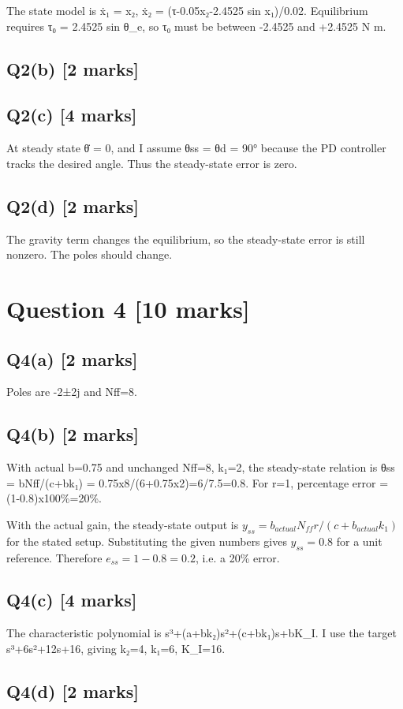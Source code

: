 \documentclass[11pt,a4paper]{article}
\begin{document}
The state model is ẋ₁ = x₂, ẋ₂ = (τ-0.05x₂-2.4525 sin x₁)/0.02.
Equilibrium requires τ₀ = 2.4525 sin θ\_e, so τ₀ must be between -2.4525 and +2.4525 N m.

\subsection*{Q2(b) \hfill [2 marks]}

\vspace{2mm}

\subsection*{Q2(c) \hfill [4 marks]}

At steady state θ̇ = 0, and I assume θss = θd = 90° because the PD controller tracks the desired angle.
Thus the steady-state error is zero.

\subsection*{Q2(d) \hfill [2 marks]}

The gravity term changes the equilibrium, so the steady-state error is still nonzero.
The poles should change.

\section*{Question 4 \hfill [10 marks]}
\subsection*{Q4(a) \hfill [2 marks]}

Poles are -2±2j and Nff=8.

\subsection*{Q4(b) \hfill [2 marks]}

With actual b=0.75 and unchanged Nff=8, k₁=2, the steady-state relation is θss = bNff/(c+bk₁) = 0.75x8/(6+0.75x2)=6/7.5=0.8.
For r=1, percentage error = (1-0.8)x100\%=20\%.\par\smallskip With the actual gain, the steady-state output is $y_{ss}=b_{actual}N_{ff}r/ (c+b_{actual}k_1)$ for the stated setup. Substituting the given numbers gives $y_{ss}=0.8$ for a unit reference. Therefore $e_{ss}=1-0.8=0.2$, i.e. a 20\% error.

\subsection*{Q4(c) \hfill [4 marks]}

The characteristic polynomial is s³+(a+bk₂)s²+(c+bk₁)s+bK\_I.
I use the target s³+6s²+12s+16, giving k₂=4, k₁=6, K\_I=16.

\subsection*{Q4(d) \hfill [2 marks]}

\vspace{2mm}
\end{document}
